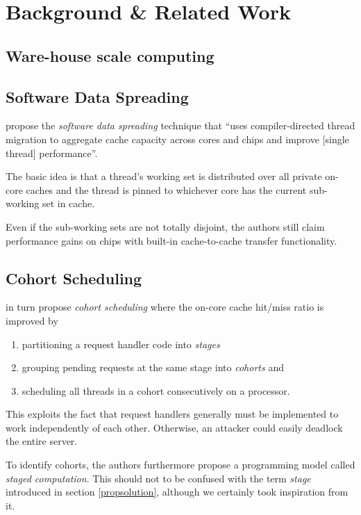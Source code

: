 \documentclass{article}
\begin{document}
\section{Background \& Related Work}\label{relatedwork}

\subsection{Ware-house scale computing}
\subsection{Software Data Spreading}
\citeauthor{sodaspr} propose the \textit{software data spreading} technique that
``uses compiler-directed thread migration to aggregate cache capacity across cores and chips and improve [single thread] performance''\cite{sodaspr}.

The basic idea is that a thread's working set is distributed over all private on-core caches
and the thread is pinned to whichever core has the current sub-working set in cache.

Even if the sub-working sets are not totally disjoint, the authors still claim performance gains
on chips with built-in cache-to-cache transfer functionality.

\subsection{Cohort Scheduling}
\citeauthor{cohort} in turn propose \textit{cohort scheduling} where the on-core cache hit/miss ratio is improved by
\begin{enumerate}
\item partitioning a request handler code into \textit{stages}
\item grouping pending requests at the same stage into \textit{cohorts} and
\item scheduling all threads in a cohort consecutively on a processor.
\end{enumerate}

This exploits the fact that request handlers generally must be implemented to work independently of each other.
Otherwise, an attacker could easily deadlock the entire server.

To identify cohorts, the authors furthermore propose a programming model called \textit{staged computation}.
This should not to be confused with the term \textit{stage} introduced in section \ref{propsolution},
although we certainly took inspiration from it.
\end{document}
